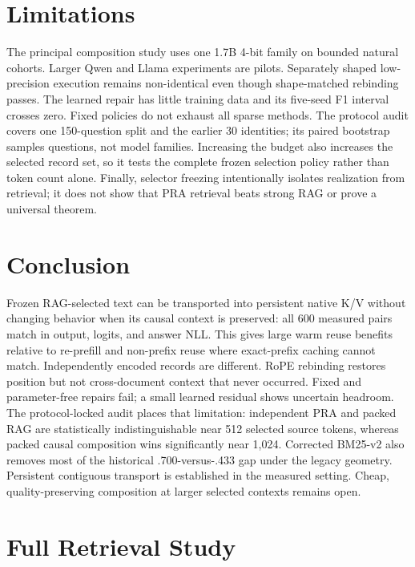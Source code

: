 \documentclass[11pt]{article}
\begin{document}
\section{Limitations}

The principal composition study uses one 1.7B 4-bit family on bounded natural
cohorts. Larger Qwen and Llama experiments are pilots. Separately shaped
low-precision execution remains non-identical even though shape-matched
rebinding passes. The learned repair has little training data and its five-seed
F1 interval crosses zero. Fixed policies do not exhaust all sparse methods.
The protocol audit covers one 150-question split and the earlier 30 identities;
its paired bootstrap samples questions, not model families. Increasing the
budget also increases the selected record set, so it tests the complete frozen
selection policy rather than token count alone. Finally, selector freezing
intentionally isolates realization from retrieval; it does not show that PRA
retrieval beats strong RAG or prove a universal theorem.

\section{Conclusion}

Frozen RAG-selected text can be transported into persistent native K/V without
changing behavior when its causal context is preserved: all 600 measured pairs
match in output, logits, and answer NLL. This gives large warm reuse benefits
relative to re-prefill and non-prefix reuse where exact-prefix caching cannot
match. Independently encoded records are different. RoPE rebinding restores
position but not cross-document context that never occurred. Fixed and
parameter-free repairs fail; a small learned residual shows uncertain headroom.
The protocol-locked audit places that limitation: independent PRA and packed RAG
are statistically indistinguishable near 512 selected source tokens, whereas
packed causal composition wins significantly near 1,024. Corrected BM25-v2 also
removes most of the historical .700-versus-.433 gap under the legacy geometry.
Persistent contiguous transport is established in the measured setting. Cheap,
quality-preserving composition at larger selected contexts remains open.




\appendix

\section{Full Retrieval Study}
\label{app:retrieval}
\end{document}
